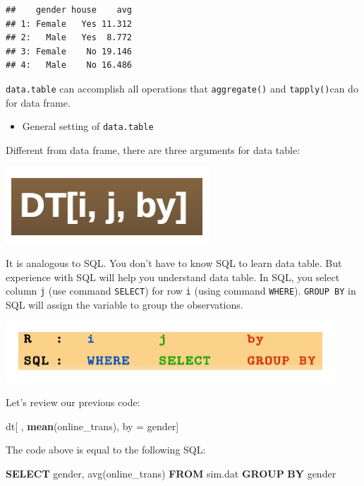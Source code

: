 \documentclass[12pt,]{krantz}
\makeatletter
\newenvironment{Shaded}{\begin{snugshade}}{\end{snugshade}}
\newcommand{\FunctionTok}[1]{\textcolor[rgb]{0,0,0}{#1}}
\newcommand{\KeywordTok}[1]{\textcolor[rgb]{0.27,0.27,0.27}{\textbf{#1}}}
\newcommand{\NormalTok}[1]{#1}
\newcommand{\StringTok}[1]{\textcolor[rgb]{0.5,0.5,0.5}{#1}}
\providecommand{\tightlist}{%
  \setlength{\itemsep}{0pt}\setlength{\parskip}{0pt}}
\newenvironment{kframe}{%
\medskip{}
\setlength{\fboxsep}{.8em}
 \def\at@end@of@kframe{}%
 \ifinner\ifhmode%
  \def\at@end@of@kframe{\end{minipage}}%
  \begin{minipage}{\columnwidth}%
 \fi\fi%
 \def\FrameCommand##1{\hskip\@totalleftmargin \hskip-\fboxsep
 \colorbox{shadecolor}{##1}\hskip-\fboxsep
     \hskip-\linewidth \hskip-\@totalleftmargin \hskip\columnwidth}%
 \MakeFramed {\advance\hsize-\width
   \@totalleftmargin\z@ \linewidth\hsize
   \@setminipage}}%
 {\par\unskip\endMakeFramed%
 \at@end@of@kframe}
\renewenvironment{Shaded}{\begin{kframe}}{\end{kframe}}
\makeatother
\begin{document}
\begin{verbatim}
##    gender house    avg
## 1: Female   Yes 11.312
## 2:   Male   Yes  8.772
## 3: Female    No 19.146
## 4:   Male    No 16.486
\end{verbatim}

\texttt{data.table} can accomplish all operations that \texttt{aggregate()} and \texttt{tapply()}can do for data frame.

\begin{itemize}
\tightlist
\item
  General setting of \texttt{data.table}
\end{itemize}

Different from data frame, there are three arguments for data table:

\includegraphics{images/datable1.png}

It is analogous to SQL. You don't have to know SQL to learn data table. But experience with SQL will help you understand data table. In SQL, you select column \texttt{j} (use command \texttt{SELECT}) for row \texttt{i} (using command \texttt{WHERE}). \texttt{GROUP\ BY} in SQL will assign the variable to group the observations.

\includegraphics{images/rSQL.png}

Let's review our previous code:

\begin{Shaded}
\begin{Highlighting}[]
\NormalTok{dt[ , }\KeywordTok{mean}\NormalTok{(online_trans), by =}\StringTok{ }\NormalTok{gender]}
\end{Highlighting}
\end{Shaded}

The code above is equal to the following SQL:

\begin{Shaded}
\begin{Highlighting}[]
\KeywordTok{SELECT}
\NormalTok{   gender,}
   \FunctionTok{avg}\NormalTok{(online_trans) }
\KeywordTok{FROM}
\NormalTok{   sim.dat }
\KeywordTok{GROUP} \KeywordTok{BY}
\NormalTok{   gender}
\end{Highlighting}
\end{Shaded}
\end{document}
